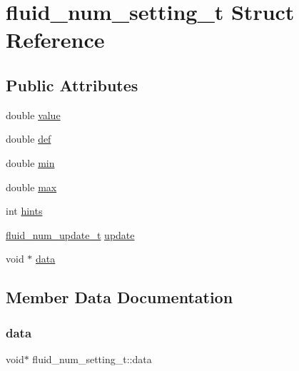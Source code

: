 \hypertarget{structfluid__num__setting__t}{}\section{fluid\+\_\+num\+\_\+setting\+\_\+t Struct Reference}
\label{structfluid__num__setting__t}
\subsection*{Public Attributes}
\begin{DoxyCompactItemize}
\item 
double \hyperlink{structfluid__num__setting__t_a8ada285150ef8bf54c90c1c6a81b439c}{value}
\item 
double \hyperlink{structfluid__num__setting__t_af282924accd3273a4a737cf71f6a6fd9}{def}
\item 
double \hyperlink{structfluid__num__setting__t_a534cf4d728c45b49a0ea491d98872de7}{min}
\item 
double \hyperlink{structfluid__num__setting__t_a1d7f8881c549ac4d72ae17a8eb9f7987}{max}
\item 
int \hyperlink{structfluid__num__setting__t_ab02c6b2c4526c3f039977b1e28aa5223}{hints}
\item 
\hyperlink{fluid__settings_8h_a90013b793275a87dc2715782e4e80c6d}{fluid\+\_\+num\+\_\+update\+\_\+t} \hyperlink{structfluid__num__setting__t_aa969dac4f43e53e5ed4ebc0fbc76c0c3}{update}
\item 
void $\ast$ \hyperlink{structfluid__num__setting__t_a8a6312c042265a1083a63b9a49e62222}{data}
\end{DoxyCompactItemize}


\subsection{Member Data Documentation}
\mbox{\label{structfluid__num__setting__t_a8a6312c042265a1083a63b9a49e62222}} 
\subsubsection{\texorpdfstring{data}{data}}
{\footnotesize\ttfamily void$\ast$ fluid\+\_\+num\+\_\+setting\+\_\+t\+::data}

